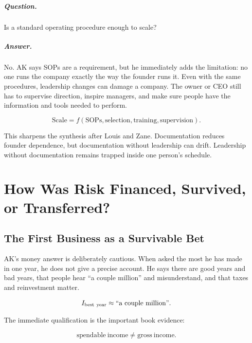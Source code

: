 \documentclass[11pt,oneside]{book}
\begin{document}
\paragraph{Question.}
Is a standard operating procedure enough to scale?

\paragraph{Answer.}
No. AK says SOPs are a requirement, but he immediately adds the limitation: no one runs the company exactly the way the founder runs it. Even with the same procedures, leadership changes can damage a company. The owner or CEO still has to supervise direction, inspire managers, and make sure people have the information and tools needed to perform.

\begin{equation}
\mathrm{Scale}
=
f(\mathrm{SOPs},\mathrm{selection},\mathrm{training},\mathrm{supervision}).
\end{equation}

This sharpens the synthesis after Louis and Zane. Documentation reduces founder dependence, but documentation without leadership can drift. Leadership without documentation remains trapped inside one person's schedule.

\chapter{How Was Risk Financed, Survived, or Transferred?}

\section{The First Business as a Survivable Bet}

AK's money answer is deliberately cautious. When asked the most he has made in one year, he does not give a precise account. He says there are good years and bad years, that people hear ``a couple million'' and misunderstand, and that taxes and reinvestment matter.

\begin{equation}
I_{\mathrm{best\ year}}\approx \hbox{``a couple million''}.
\end{equation}

The immediate qualification is the important book evidence:

\begin{equation}
\mathrm{spendable\ income}\neq \mathrm{gross\ income}.
\end{equation}
\end{document}
